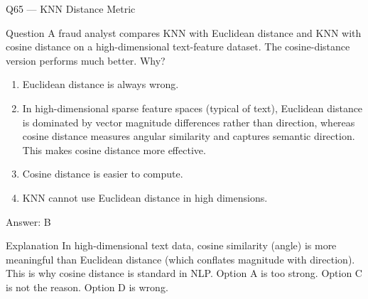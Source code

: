 \documentclass[aspectratio=169,8pt]{beamer}
\begin{document}
	\begin{frame}{Q65 --- KNN Distance Metric}
		\begin{block}{Question}
			A fraud analyst compares KNN with Euclidean distance and KNN with cosine distance on a high-dimensional text-feature dataset. The cosine-distance version performs much better. Why?
		\end{block}
		\begin{enumerate}
			\item Euclidean distance is always wrong.
			\item In high-dimensional sparse feature spaces (typical of text), Euclidean distance is dominated by vector magnitude differences rather than direction, whereas cosine distance measures angular similarity and captures semantic direction. This makes cosine distance more effective.
			\item Cosine distance is easier to compute.
			\item KNN cannot use Euclidean distance in high dimensions.
		\end{enumerate}
		\begin{exampleblock}{Answer: B}\end{exampleblock}
		\begin{block}{Explanation}
			In high-dimensional text data, cosine similarity (angle) is more meaningful than Euclidean distance (which conflates magnitude with direction). This is why cosine distance is standard in NLP. Option A is too strong. Option C is not the reason. Option D is wrong.
		\end{block}
	\end{frame}
	
\end{document}
